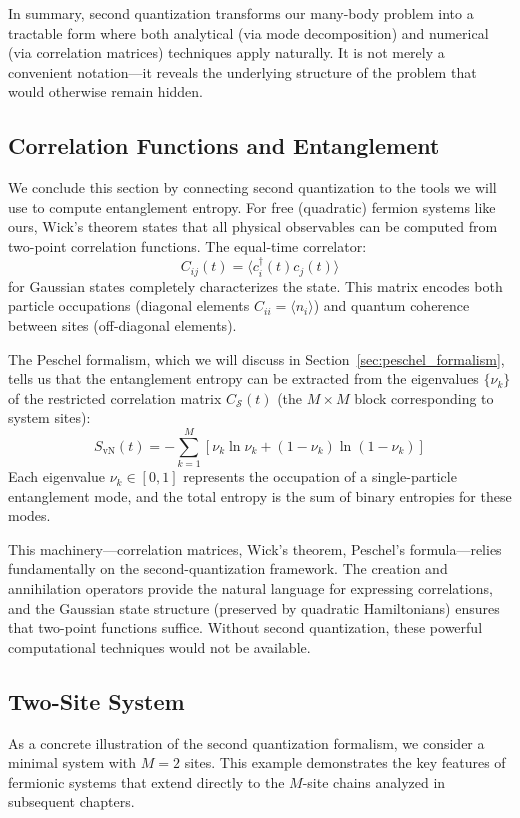 \documentclass[12pt,oneside,openright]{report}
\theoremstyle{definition}
\theoremstyle{plain}
\theoremstyle{remark}
\begin{document}
In summary, second quantization transforms our many-body problem into a tractable form where 
both analytical (via mode decomposition) and numerical (via correlation matrices) techniques 
apply naturally. It is not merely a convenient notation—it reveals the underlying structure 
of the problem that would otherwise remain hidden.

\subsection{Correlation Functions and Entanglement}
\label{subsec:connection_correlation}
We conclude this section by connecting second quantization to the tools we will use to compute 
entanglement entropy. For free (quadratic) fermion systems like ours, Wick's theorem states 
that all physical observables can be computed from two-point correlation functions. The 
equal-time correlator:
\begin{equation}
C_{ij}(t) = \langle c_i^\dagger(t) c_j(t) \rangle
\end{equation}
for Gaussian states completely characterizes the state. This matrix encodes both particle occupations (diagonal elements 
$C_{ii} = \langle n_i \rangle$) and quantum coherence between sites (off-diagonal elements).

The Peschel formalism, which we will discuss in Section~\ref{sec:peschel_formalism}, tells us that 
the entanglement entropy can be extracted from the eigenvalues $\{\nu_k\}$ of the restricted 
correlation matrix $C_{\mathcal{S}}(t)$ (the $M \times M$ block corresponding to system sites):
\begin{equation}
S_{\mathrm{vN}}(t) = -\sum_{k=1}^M \left[\nu_k \ln \nu_k + (1-\nu_k)\ln(1-\nu_k)\right]
\end{equation}
Each eigenvalue $\nu_k \in [0,1]$ represents the occupation of a single-particle entanglement mode, 
and the total entropy is the sum of binary entropies for these modes.

\noindent This machinery—correlation matrices, Wick's theorem, Peschel's formula—relies fundamentally on 
the second-quantization framework. The creation and annihilation operators provide the natural 
language for expressing correlations, and the Gaussian state structure (preserved by quadratic 
Hamiltonians) ensures that two-point functions suffice. Without second quantization, these 
powerful computational techniques would not be available.

\subsection{Two-Site System}
\label{subsec:two_site_example}
As a concrete illustration of the second quantization formalism, we consider a minimal system 
with $M=2$ sites. This example demonstrates the key features of fermionic systems that extend 
directly to the $M$-site chains analyzed in subsequent chapters.
\end{document}
